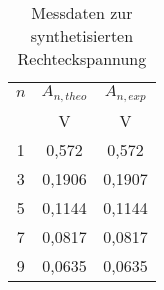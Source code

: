 
\begin{table}[h!]
  \centering
  \caption{Messdaten zur synthetisierten Rechteckspannung}
  \label{tab:recht}
  \begin{tabular}{c c c }
    \toprule
$n$  & $A_{n, theo}$ & $A_{n, exp}$ \\
      & V           & V             \\

    \midrule


    1	& 0,572 	&  0,572	\\
    3	& 0,1906	&  0,1907	\\
    5	& 0,1144	&  0,1144	\\
    7	& 0,0817	&  0,0817	\\
    9	& 0,0635	&  0,0635	\\



    \bottomrule
  \end{tabular}
\end{table}
